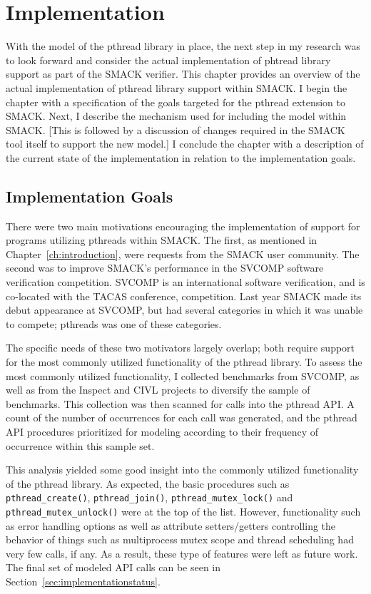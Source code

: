 \chapter{Implementation}\label{ch:implementation}
With the model of the pthread library in place, the next step in my
research was to look forward and consider the actual implementation of
phtread library support as part of the SMACK verifier.  This chapter
provides an overview of the actual implementation of pthread library
support within SMACK.  I begin the chapter with a specification of the
goals targeted for the pthread extension to SMACK.  Next, I describe
the mechanism used for including the model within SMACK.  [This is
followed by a discussion of changes required in the SMACK tool itself
to support the new model.]  I conclude the chapter with a description
of the current state of the implementation in relation to the
implementation goals.

\section{Implementation Goals}\label{sec:implementationgoals}
There were two main motivations encouraging the implementation of
support for programs utilizing pthreads within SMACK.  The first, as
mentioned in Chapter~\ref{ch:introduction}, were requests from the
SMACK user community.  The second was to improve SMACK's performance
in the SVCOMP software verification competition.  SVCOMP is an
international software verification, and is co-located with the TACAS
conference, competition.  Last year SMACK made its debut appearance at
SVCOMP, but had several categories in which it was unable to compete;
pthreads was one of these categories.

The specific needs of these two motivators largely overlap; both
require support for the most commonly utilized functionality of the
pthread library.  To assess the most commonly utilized functionality,
I collected benchmarks from SVCOMP, as well as from the Inspect and
CIVL projects to diversify the sample of benchmarks.  This collection
was then scanned for calls into the pthread API.  A count of the
number of occurrences for each call was generated, and the pthread API
procedures prioritized for modeling according to their frequency of
occurrence within this sample set. 

This analysis yielded some good insight into the commonly utilized
functionality of the pthread library.  As expected, the basic
procedures such as \lstinline[breaklines]|pthread_create()|,
\lstinline[breaklines]|pthread_join()|,
\lstinline[breaklines]|pthread_mutex_lock()| and 
\lstinline[breaklines]|pthread_mutex_unlock()| were at the top of the
list. However, functionality such as error handling options as well as
attribute setters/getters controlling the behavior of things such as
multiprocess mutex scope and thread scheduling had very few calls, if
any.  As a result, these type of features were left as future
work. The final set of modeled API calls can be seen in
Section~\ref{sec:implementationstatus}.  

